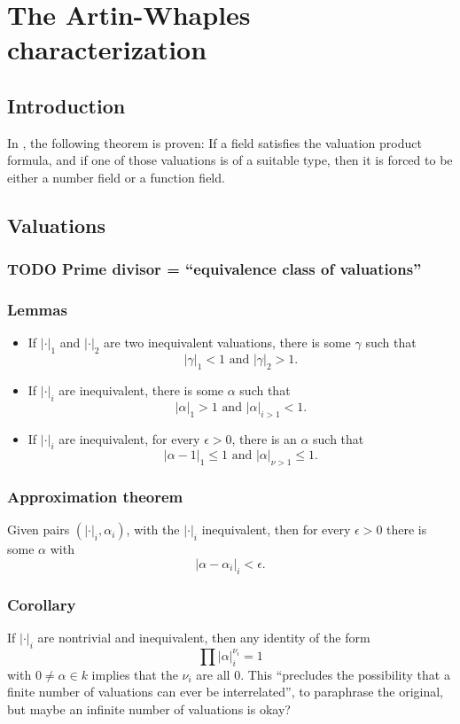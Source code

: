 \chapter{The Artin-Whaples characterization}
\section{Introduction}
\label{sec:orgheadline1}

In \cite{artinwhaples}, the following theorem is proven:
If a field satisfies the valuation product formula, and if one of those valuations is of a suitable type, then it is forced to be either a number field or a function field.

\section{Valuations}
\label{sec:orgheadline6}
\subsection{{\bfseries\sffamily TODO} Prime divisor = ``equivalence class of valuations''}
\label{sec:orgheadline2}
\subsection{Lemmas}
\label{sec:orgheadline3}
\begin{itemize}
\item If \(|\cdot|_1\) and \(|\cdot|_2\) are two inequivalent valuations, there is some \(\gamma\) such that \[|\gamma|_1 < 1 \text{ and } |\gamma|_2 > 1.\]
\item If \(|\cdot|_i\) are inequivalent, there is some \(\alpha\) such that \[|\alpha|_1 > 1\text{ and }|\alpha|_{i>1} < 1.\]
\item If \(|\cdot|_i\) are inequivalent, for every \(\epsilon>0\), there is an \(\alpha\) such that \[|\alpha-1|_1 \leq 1 \text{ and } |\alpha|_{\nu>1}\leq 1.\]
\end{itemize}
\subsection{Approximation theorem}
\label{sec:orgheadline4}
Given pairs \((|\cdot|_i, \alpha_i)\), with the \(|\cdot|_i\) inequivalent, then for every \(\epsilon>0\) there is some \(\alpha\) with 
\[|\alpha - \alpha_i|_i < \epsilon.\]
\subsection{Corollary}
\label{sec:orgheadline5}
If \(|\cdot|_i\) are nontrivial and inequivalent, then any identity of the form
\[\prod |\alpha|_{i}^{\nu_i} = 1\]
with \(0\neq \alpha\in k\) implies that the \(\nu_i\) are all \(0\).
This ``precludes the possibility that a finite number of valuations can ever be interrelated'', to paraphrase the original, but maybe an infinite number of valuations is okay?
